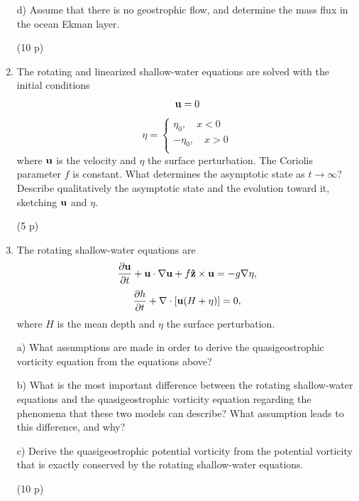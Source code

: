 \documentclass[12pt,a4paper]{article}
\newcommand{\bu}{{\bf u}}
\newcommand{\hz}{{\bf\hat{z}}}
\begin{document}
\begin{enumerate}
d) Assume that there is no geostrophic flow, and determine the mass 
flux in the ocean Ekman layer.

(10 p)\\
\item
The rotating and linearized shallow-water equations are solved with the 
initial conditions
$$
\bu=0
$$
$$
\eta = \left\{
\begin{array}{rcl}
\eta_0, \quad x <  0 \\
-\eta_0, \quad x  > 0 \\
\end{array}
\right.
$$
where $\bu$ is the velocity and $\eta$ the surface perturbation. The 
Coriolis parameter $f$ is constant. What determines the asymptotic state
as $t\rightarrow\infty$? Describe qualitatively the asymptotic state and 
the evolution toward it, sketching $\bu$ and $\eta$.

(5 p)\\
\item 
The rotating shallow-water equations are
$$
\frac{\partial \bu}{\partial t}+\bu\cdot\nabla\bu+f\hz\times\bu
= -g\nabla\eta,
$$
$$
\frac{\partial h}{\partial t}+\nabla\cdot[\bu(H+\eta)] = 0,
$$
where $H$ is the mean depth and $\eta$ the surface  perturbation.

a) What assumptions are made in order to derive the quasigeostrophic
vorticity equation from the equations above?

b) What is the most important difference between the rotating shallow-water
equations and the quasigeostrophic vorticity equation regarding the 
phenomena that these two models can describe? What assumption leads
to this difference, and why?

c) Derive the quasigeostrophic potential vorticity from the potential  
vorticity that is exactly conserved by the rotating shallow-water 
equations.

(10 p)\\
\end{enumerate}
\end{document}
